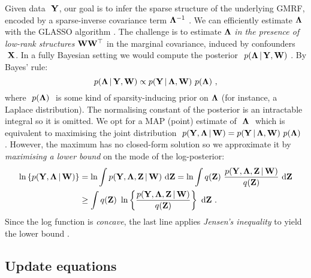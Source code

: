       Given data $~\mathbf{Y}$, our goal is to infer the sparse structure of the underlying GMRF, encoded by a sparse-inverse covariance term $\mathbf{\Lambda}^{-1}~$. We can efficiently estimate $\mathbf{\Lambda}$ with the GLASSO algorithm \citep{Friedman:sparse08, Banerjee:model2008}. The challenge is to estimate $\mathbf{\Lambda}$ \emph{in the presence of low-rank structures} $\mathbf{W}\mathbf{W}^\top$ in the marginal covariance, induced by confounders $~\mathbf{X}$. In a fully Bayesian setting we would compute the posterior $~p(\mathbf{\Lambda} \,|\, \mathbf{Y}, \mathbf{W})~$. By Bayes' rule:
      \[
	p(\mathbf{\Lambda} \,|\, \mathbf{Y}, \mathbf{W}) \propto p(\mathbf{Y} \,|\, \mathbf{\Lambda}, \mathbf{W}) ~ p(\mathbf{\Lambda}) ~,
      \]
      where $~p(\mathbf{\Lambda})~$ is some kind of sparsity-inducing prior on $\mathbf{\Lambda}$ (for instance, a Laplace distribution). The normalising constant of the posterior is an intractable integral so it is omitted. We opt for a MAP (point) estimate of $~\mathbf{\Lambda}~$ which is equivalent to maximising the joint distribution $~p(\mathbf{Y}, \mathbf{\Lambda} \,|\, \mathbf{W}) = p(\mathbf{Y} \,|\, \mathbf{\Lambda}, \mathbf{W}) ~ p(\mathbf{\Lambda})~$. However, the maximum has no closed-form solution so we approximate it by \emph{maximising a lower bound} on the mode of the log-posterior:
      \begin{align}
	\nonumber \ln \left\{ p(\mathbf{Y}, \mathbf{\Lambda} \,|\, \mathbf{W}) \right\}
	& = \ln \int p( \mathbf{Y}, \mathbf{\Lambda}, \mathbf{Z} \,|\, \mathbf{W} ) ~ \textrm{d} \mathbf{Z}
	= \ln \int q(\mathbf{Z}) ~ \frac{ p( \mathbf{Y}, \mathbf{\Lambda}, \mathbf{Z} \,|\, \mathbf{W} ) }{ q(\mathbf{Z}) } ~ \textrm{d} \mathbf{Z} \\
	\label{equ:app1_LB} & \geq \int q(\mathbf{Z}) ~ \ln \left\{ \frac{ p( \mathbf{Y}, \mathbf{\Lambda}, \mathbf{Z} \,|\, \mathbf{W} ) }{ q(\mathbf{Z}) } \right\} ~ \textrm{d} \mathbf{Z} ~.
      \end{align}
      Since the log function is \textit{concave}, the last line applies \textit{Jensen's inequality} to yield the lower bound \citep{MacKay:book03}.
    

    \subsection{Update equations}


